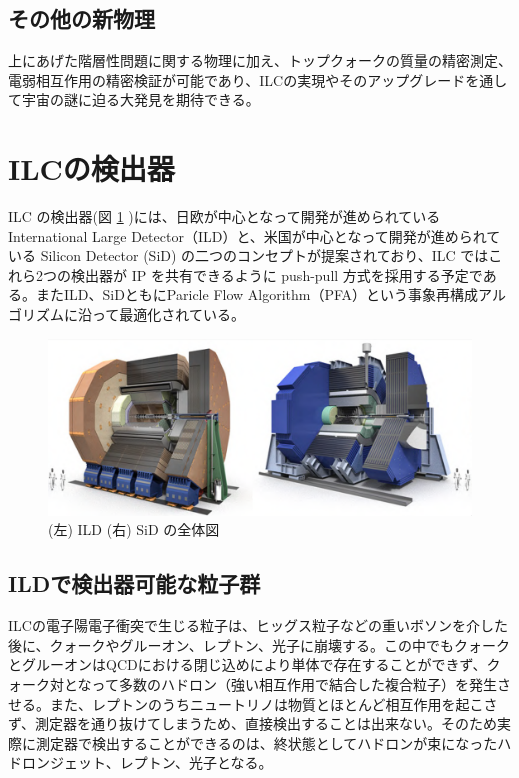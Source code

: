 \subsection{その他の新物理}
上にあげた階層性問題に関する物理に加え、トップクォークの質量の精密測定、電弱相互作用の精密検証が可能であり、ILCの実現やそのアップグレードを通して宇宙の謎に迫る大発見を期待できる。
\section{ILCの検出器}
ILC の検出器(図 \ref{ilcdetector} )には、日欧が中心となって開発が進められている International Large Detector（ILD）と、米国が中心となって開発が進められている Silicon Detector (SiD) の二つのコンセプトが提案されており、ILC ではこれら2つの検出器が IP を共有できるように push-pull 方式を採用する予定である。またILD、SiDともにParicle Flow Algorithm（PFA）という事象再構成アルゴリズムに沿って最適化されている。
\begin{figure}[h]
	\begin{center}
        \includegraphics[keepaspectratio, scale=0.4]
 	{Figure/Introduction/detector.png}
 		\caption[ILDとSiDの全体図]{(左) ILD (右) SiD の全体図\cite{tdr2}}
 		\label{ilcdetector}
	\end{center}
\end{figure}
\subsection{ILDで検出器可能な粒子群}
ILCの電子陽電子衝突で生じる粒子は、ヒッグス粒子などの重いボソンを介した後に、クォークやグルーオン、レプトン、光子に崩壊する。この中でもクォークとグルーオンはQCDにおける閉じ込めにより単体で存在することができず、クォーク対となって多数のハドロン（強い相互作用で結合した複合粒子）を発生させる。また、レプトンのうちニュートリノは物質とほとんど相互作用を起こさず、測定器を通り抜けてしまうため、直接検出することは出来ない。そのため実際に測定器で検出することができるのは、終状態としてハドロンが束になったハドロンジェット、レプトン、光子となる。
